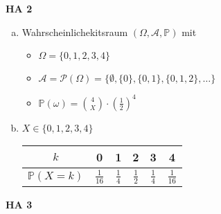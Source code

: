 \documentclass[a4paper,12pt]{article}
\newcommand{\Aufgabe}[1]{
        {
        \vspace*{0.5cm}
        \textbf{HA #1}
        \vspace*{0.2cm}
    }
}
\begin{document}
    \Aufgabe{2}

    \begin{enumerate}[(a)]
        \item 
        
        Wahrscheinlichekitsraum $ (\Omega, \mathcal{A}, \mathbb{P}) $ mit

        \begin{itemize}
            \item 
            $ \Omega = \{0, 1, 2, 3, 4\} $

            \item
            $ \mathcal{A} = \mathcal{P}(\Omega) = \{\emptyset, \{0\}, \{0, 1\}, \{0, 1, 2\}, \dots\} $ 
    
            \item
            $ \displaystyle \mathbb{P}(\omega) = \binom{4}{X} \cdot (\frac{1}{2})^4 $
        \end{itemize}

        \item

        $ X \in \{0, 1, 2, 3, 4\} $

        \bigskip

        \setlength{\tabcolsep}{10pt} %
        \renewcommand{\arraystretch}{2.5} %
        \begin{tabular}{c|c|c|c|c|c}
            $ k $ & 0 & 1 & 2 & 3 & 4 \\
            \hline
            $ \displaystyle \mathbb{P}(X = k) $ & $ \displaystyle \frac{1}{16} $ & $ \displaystyle \frac{1}{4} $ & $ \displaystyle \frac{1}{2} $ & $ \displaystyle \frac{1}{4} $ & $ \displaystyle\frac{1}{16} $ \\
        \end{tabular}
    \end{enumerate}

    \Aufgabe{3}
    
\end{document}

